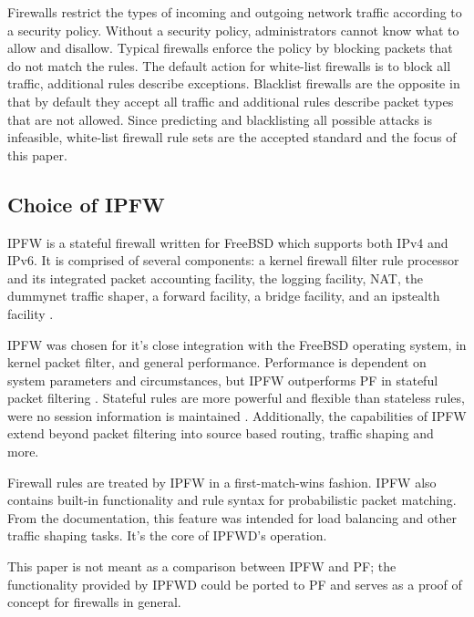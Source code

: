 \documentclass[journal]{IEEEtran}
\begin{document}
    Firewalls restrict the types of incoming and outgoing network traffic
    according to a security policy. Without a security policy, administrators
    cannot know what to allow and disallow. Typical firewalls enforce the
    policy by blocking packets that do not match the rules. The default action
    for white-list firewalls is to block all traffic, additional rules describe
    exceptions. Blacklist firewalls are the opposite in that by default they
    accept all traffic and additional rules describe packet types that are not
    allowed. Since predicting and blacklisting all possible attacks is
    infeasible, white-list firewall rule sets are the accepted standard and the
    focus of this paper.

  \subsection{Choice of IPFW}

    IPFW is a stateful firewall written for FreeBSD which supports both IPv4
    and IPv6. It is comprised of several components: a kernel firewall filter
    rule processor and its integrated packet accounting facility, the logging
    facility, NAT, the dummynet traffic shaper, a forward facility, a bridge
    facility, and an ipstealth facility \cite{freebsdhandbook}.

    IPFW was chosen for it's close integration with the FreeBSD operating
    system, in kernel packet filter, and general performance. Performance is
    dependent on system parameters and circumstances, but IPFW outperforms PF
    in stateful packet filtering \cite{ipfwvspf}. Stateful rules are more
    powerful and flexible than stateless rules, were no session information is
    maintained \cite{networksecurity}.  Additionally, the capabilities of IPFW
    extend beyond packet filtering into source based routing, traffic shaping
    and more. 

    Firewall rules are treated by IPFW in a first-match-wins fashion. IPFW also
    contains built-in functionality and rule syntax for probabilistic packet
    matching. From the documentation, this feature was intended for load
    balancing and other traffic shaping tasks. It's the core of IPFWD's
    operation. 

    This paper is not meant as a comparison between IPFW and PF; the
    functionality provided by IPFWD could be ported to PF and serves as a proof
    of concept for firewalls in general.
\end{document}
